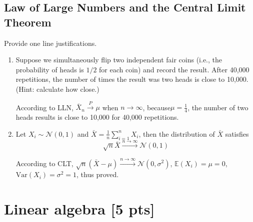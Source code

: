 \documentclass[a4paper]{article}
\theoremstyle{definition}
\newcommand{\Var}{\mathrm{Var}}
\newenvironment{soln}{
    \leavevmode\color{blue}\ignorespaces
}{}
\begin{document}
\subsection{Law of Large Numbers and the Central Limit Theorem}
Provide one line justifications.
\begin{enumerate}
\item Suppose we simultaneously flip two independent fair coins (i.e., the probability of heads is $1/2$ for each coin)
  and record the result. After 40,000 repetitions, the number
  of times the result was two heads is close to 10,000.  (Hint: calculate how close.)
  
  \begin{soln}
  According to LLN, $\bar{X}_n \overset{P}{\longrightarrow} \mu$ when $n \longrightarrow \infty$, because$\mu = \frac{1}{4}$, the number of two heads results is close to 10,000 for 40,000 repetitions.
  \end{soln}
  
\item Let $X_i\sim\mathcal{N}(0, 1)$ and $\bar{X} = \frac{1}{n}\sum_{i=1}^n X_i$, then the distribution of $\bar{X}$ satisfies 
  $$\sqrt{n}\bar{X}\overset{n\rightarrow\infty}{\longrightarrow}\mathcal{N}(0, 1)$$
  \begin{soln}
  According to CLT, $\sqrt{n}(\bar{X}-\mu)\overset{n\rightarrow\infty}{\longrightarrow}\mathcal{N}(0, \sigma^2)$, $\mathbb{E}(X_i) = \mu = 0$, $\Var(X_i) = \sigma^2 = 1$, thus proved.
  \end{soln}
  
\end{enumerate}



\section{Linear algebra [5 pts]}
\end{document}
